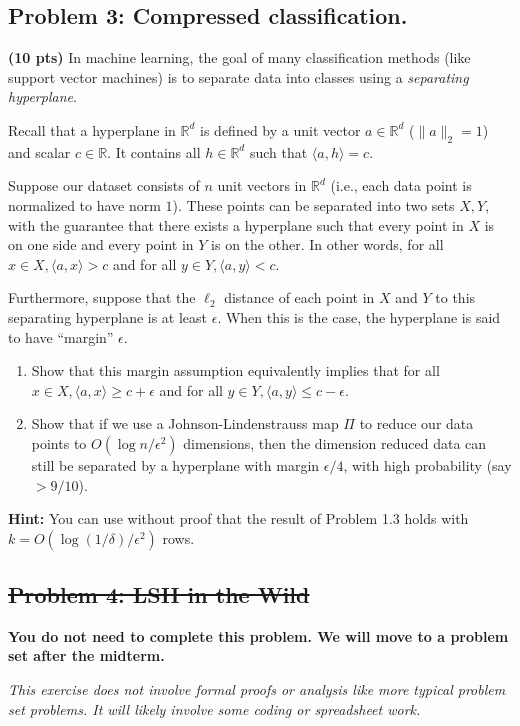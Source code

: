 \documentclass[10pt]{article}
\newcommand{\R}{\mathbb{R}}
\begin{document}
\subsection{Problem 3: Compressed classification.}
\textbf{(10 pts)} In machine learning, the goal of many classification methods (like support vector machines) is to separate data into classes using a \emph{separating hyperplane}.

Recall that a hyperplane in $\R^d$ is defined by a unit vector $a \in \R^d$ ($\|a\|_2 = 1$) and scalar $c \in \R$. It contains all  $h \in \R^d$ such that $\langle a, h\rangle = c$. 

Suppose our dataset consists of $n$ unit vectors in $\R^d$ (i.e., each data point is normalized to have norm $1$). These points can be separated into two sets $X, Y$,
with the guarantee that there exists a hyperplane such that every point in $X$ is on one side and every point in 
$Y$ is on the other. In other words, for all $x\in X, \langle a, x\rangle > c$ and for all $y\in Y, \langle a, y\rangle < c$.

Furthermore, suppose that the $\ell_2$ distance of each point in $X$ and $Y$ to this separating hyperplane is at least $\epsilon$. When this is the case, the hyperplane is said to have ``margin'' $\epsilon$. 

\begin{enumerate}
	\item Show that this margin assumption equivalently implies that for all $x\in X, \langle a, x\rangle \geq c + \epsilon$ and for all $y\in Y, \langle a, y\rangle \leq c - \epsilon$.
	
	\item Show that if we use a Johnson-Lindenstrauss map $\Pi$ to reduce our data points to $O(\log n/\epsilon^2)$ dimensions, then the dimension reduced data can still be separated by a hyperplane with margin $\epsilon/4$, with high probability (say $> 9/10$).
\end{enumerate}
\textbf{Hint:} You can use without proof that the result of Problem 1.3 holds with $k  = O(\log(1/\delta)/\epsilon^2)$ rows. 

\subsection{\sout{Problem 4: LSH in the Wild}}

\textbf{You do not need to complete this problem. We will move to a problem set after the midterm.} 

\textit{This exercise does not involve formal proofs or analysis like more typical problem set problems. It will likely involve some coding or spreadsheet work.}
\vspace{.25em}
\end{document}
